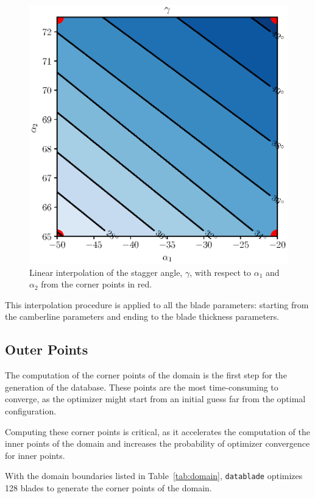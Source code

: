 \begin{figure}[H]
    \centering
    \includegraphics[scale=\scaleContour]{./images/staggerLinear.eps}
    \caption{Linear interpolation of the stagger angle, $\gamma$, with respect to $\alpha_1$ and $\alpha_2$ from the corner points in red.}
    \label{fig:linearInterpolation}
\end{figure}

This interpolation procedure is applied to all the blade parameters: starting from the 
camberline parameters and ending to the blade thickness parameters.

\subsection{Outer Points}

The computation of the corner points of the domain is the first step for the generation of the database. 
These points are the most time-consuming to converge, as the optimizer might start from an initial 
guess far from the optimal configuration.

Computing these corner points is critical, as it accelerates the computation of the inner points of the domain and increases the probability of optimizer convergence for inner points.

With the domain boundaries listed in Table~\ref{tab:domain}, \texttt{datablade} optimizes 128 blades to generate the corner points of the domain.

